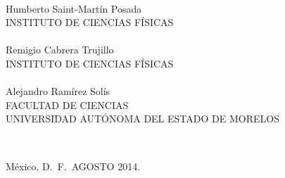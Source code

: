 \documentclass[12pt,letterpaper,twoside,openright,BCOR=1cm]{book}
\begin{document}
\begin{titlepage}
\begin{center}
\begin{verbatim}
\end{verbatim}\\
\small{Humberto Saint-Mart\'in Posada}\\
\small{INSTITUTO DE CIENCIAS F\'ISICAS}\\
\hspace{1truecm}\\
\small{Remigio Cabrera Trujillo}\\
\small{INSTITUTO DE CIENCIAS F\'ISICAS}\\
\hspace{1truecm}\\
\small{Alejandro Ram\'irez Sol\'is}\\
\small{FACULTAD DE CIENCIAS}\\
\small{UNIVERSIDAD AUT\'ONOMA DEL ESTADO DE MORELOS}\\
\begin{verbatim}

\end{verbatim}\\
\small{M\'exico, D.\ F.\ AGOSTO 2014.}\\
\end{center}
\end{titlepage}
\end{document}
